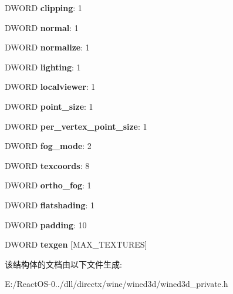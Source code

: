 \begin{DoxyCompactItemize}
D\+W\+O\+RD {\bfseries clipping}\+: 1
\item 
\mbox{\label{structwined3d__ffp__vs__settings_a8c6c6bae4cc82319bea1b9fbe127d8e3}} 
D\+W\+O\+RD {\bfseries normal}\+: 1
\item 
\mbox{\label{structwined3d__ffp__vs__settings_a43205c58b1d78546b44e3cc08c50df02}} 
D\+W\+O\+RD {\bfseries normalize}\+: 1
\item 
\mbox{\label{structwined3d__ffp__vs__settings_a893a9e4cbb1a18bead2f374f7a12aaee}} 
D\+W\+O\+RD {\bfseries lighting}\+: 1
\item 
\mbox{\label{structwined3d__ffp__vs__settings_abdf267b8752fab0b6d95822ee6d3706b}} 
D\+W\+O\+RD {\bfseries localviewer}\+: 1
\item 
\mbox{\label{structwined3d__ffp__vs__settings_a00d842a27360c71ed9659de2c6c0d0e9}} 
D\+W\+O\+RD {\bfseries point\+\_\+size}\+: 1
\item 
\mbox{\label{structwined3d__ffp__vs__settings_acf48b71e3cd8e91c2718074c97da6aba}} 
D\+W\+O\+RD {\bfseries per\+\_\+vertex\+\_\+point\+\_\+size}\+: 1
\item 
\mbox{\label{structwined3d__ffp__vs__settings_a7f2d3cd47c1594e507e34fa0d18e6d17}} 
D\+W\+O\+RD {\bfseries fog\+\_\+mode}\+: 2
\item 
\mbox{\label{structwined3d__ffp__vs__settings_a1798dca6bce8e7ed8899bc30bd8f7dee}} 
D\+W\+O\+RD {\bfseries texcoords}\+: 8
\item 
\mbox{\label{structwined3d__ffp__vs__settings_a41da8156c31aad939f09791f790a7c78}} 
D\+W\+O\+RD {\bfseries ortho\+\_\+fog}\+: 1
\item 
\mbox{\label{structwined3d__ffp__vs__settings_af268545da392f041d2ea24727771c5f7}} 
D\+W\+O\+RD {\bfseries flatshading}\+: 1
\item 
\mbox{\label{structwined3d__ffp__vs__settings_a35d6d388d4eac809d40fe5940684ed5d}} 
D\+W\+O\+RD {\bfseries padding}\+: 10
\item 
\mbox{\label{structwined3d__ffp__vs__settings_ad81f7aef97050344bb46d241211b0e11}} 
D\+W\+O\+RD {\bfseries texgen} \mbox{[}M\+A\+X\+\_\+\+T\+E\+X\+T\+U\+R\+ES\mbox{]}
\end{DoxyCompactItemize}


该结构体的文档由以下文件生成\+:\begin{DoxyCompactItemize}
\item 
E\+:/\+React\+O\+S-\/0../dll/directx/wine/wined3d/wined3d\+\_\+private.\+h\end{DoxyCompactItemize}
